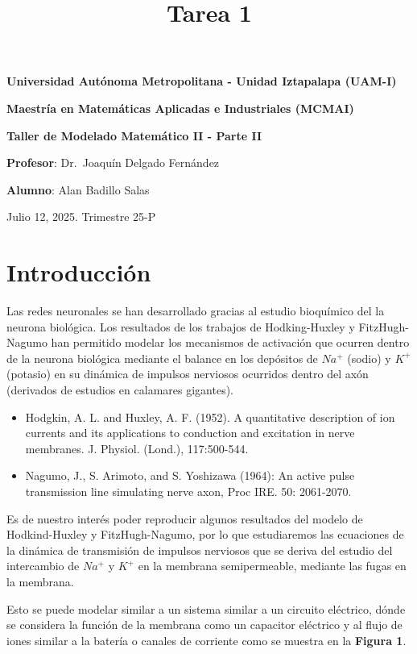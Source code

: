\documentclass[11pt]{article}
\title{Tarea 1}
\providecommand{\tightlist}{%
      \setlength{\itemsep}{0pt}\setlength{\parskip}{0pt}}
\begin{document}
    
    \maketitle
    
    

    
    \newcommand{\pandocbounded}[1]{#1}

\textbf{Universidad Autónoma Metropolitana - Unidad Iztapalapa (UAM-I)}

\textbf{Maestría en Matemáticas Aplicadas e Industriales (MCMAI)}

\textbf{Taller de Modelado Matemático II - Parte II}

\textbf{Profesor}: Dr.~Joaquín Delgado Fernández

\textbf{Alumno}: Alan Badillo Salas

Julio 12, 2025. Trimestre 25-P

    \section{Introducción}\label{introducciuxf3n}

Las redes neuronales se han desarrollado gracias al estudio bioquímico
del la neurona biológica. Los resultados de los trabajos de
Hodking-Huxley y FitzHugh-Nagumo han permitido modelar los mecanismos de
activación que ocurren dentro de la neurona biológica mediante el
balance en los depósitos de \(Na^+\) (sodio) y \(K^+\) (potasio) en su
dinámica de impulsos nerviosos ocurridos dentro del axón (derivados de
estudios en calamares gigantes).

\begin{itemize}
\tightlist
\item
  Hodgkin, A. L. and Huxley, A. F. (1952). A quantitative description of
  ion currents and its applications to conduction and excitation in
  nerve membranes. J. Physiol. (Lond.), 117:500-544.
\item
  Nagumo, J., S. Arimoto, and S. Yoshizawa (1964): An active pulse
  transmission line simulating nerve axon, Proc IRE. 50: 2061-2070.
\end{itemize}

Es de nuestro interés poder reproducir algunos resultados del modelo de
Hodkind-Huxley y FitzHugh-Nagumo, por lo que estudiaremos las ecuaciones
de la dinámica de transmisión de impulsos nerviosos que se deriva del
estudio del intercambio de \(Na^+\) y \(K^+\) en la membrana
semipermeable, mediante las fugas en la membrana.

Esto se puede modelar similar a un sistema similar a un circuito
eléctrico, dónde se considera la función de la membrana como un
capacitor eléctrico y al flujo de iones similar a la batería o canales
de corriente como se muestra en la \textbf{Figura 1}.
\end{document}

